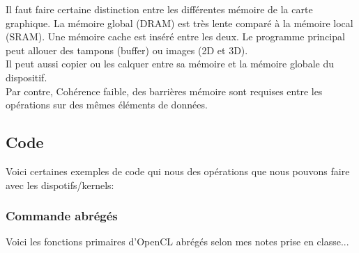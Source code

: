 \documentclass[oneside]{book}
\begin{document}
Il faut faire certaine distinction entre les différentes mémoire de la carte graphique. La mémoire global (DRAM) est très lente comparé à la mémoire local (SRAM). Une mémoire cache est inséré entre les deux. Le programme principal peut allouer des tampons (buffer)
ou images (2D et 3D).\\

Il peut aussi copier ou les calquer
entre sa mémoire et la mémoire globale du dispositif.\\

Par contre, Cohérence faible, des barrières mémoire sont requises
entre les opérations sur des mêmes éléments de données.\\

\subsection{Code}
Voici certaines exemples de code qui nous des opérations que nous pouvons faire avec les dispotifs/kernels:
\subsubsection{Commande abrégés}
Voici les fonctions primaires d'OpenCL abrégés selon mes notes prise en classe...
\end{document}
